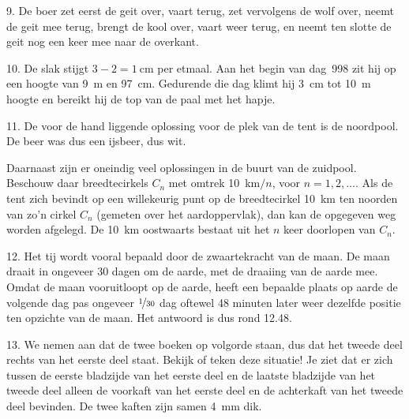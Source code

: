 \begin{problem}{9.}
    De boer zet eerst de geit over, vaart terug, zet vervolgens de wolf over, neemt de geit mee terug, brengt de kool over, vaart weer terug, en neemt ten slotte de geit nog een keer mee naar de overkant.
\end{problem}

\begin{problem}{10.}
    De slak stijgt $3 - 2 = \SI{1}{\cm}$ per etmaal. Aan het begin van dag~998 zit hij op een hoogte van \SI{9}{\metre} en \SI{97}{\cm}. Gedurende die dag klimt hij \SI{3}{\cm} tot \SI{10}{\metre} hoogte en bereikt hij de top van de paal met het hapje.
\end{problem}

\begin{problem}{11.}
    De voor de hand liggende oplossing voor de plek van de tent is de noordpool. De beer was dus een ijsbeer, dus wit.

    Daarnaast zijn er oneindig veel oplossingen in de buurt van de zuidpool. Beschouw daar breedtecirkels $C_n$ met omtrek \SI{10}{\km}$/n$, voor $n = 1,2,\dotsc$. Als de tent zich bevindt op een willekeurig punt op de breedtecirkel \SI{10}{\km} ten noorden van zo'n cirkel $C_n$ (gemeten over het aardoppervlak), dan kan de opgegeven weg worden afgelegd. De \SI{10}{\km} oostwaarts bestaat uit het $n$ keer doorlopen van $C_n$.
\end{problem}

\begin{problem}{12.}
    Het tij wordt vooral bepaald door de zwaartekracht van de maan. De maan draait in ongeveer 30 dagen om de aarde, met de draaiing van de aarde mee. Omdat de maan vooruitloopt op de aarde, heeft een bepaalde plaats op aarde de volgende dag pas ongeveer $\nicefrac{1}{30}$ dag oftewel 48 minuten later weer dezelfde positie ten opzichte van de maan. Het antwoord is dus rond \SI{12.48}{\uur}.
\end{problem}

\begin{problem}{13.}
    We nemen aan dat de twee boeken op volgorde staan, dus dat het tweede deel rechts van het eerste deel staat. Bekijk of teken deze situatie! Je ziet dat er zich tussen de eerste bladzijde van het eerste deel en de laatste bladzijde van het tweede deel alleen de voorkaft van het eerste deel en de achterkaft van het tweede deel bevinden. De twee kaften zijn samen \SI{4}{\mm} dik.
\end{problem}

